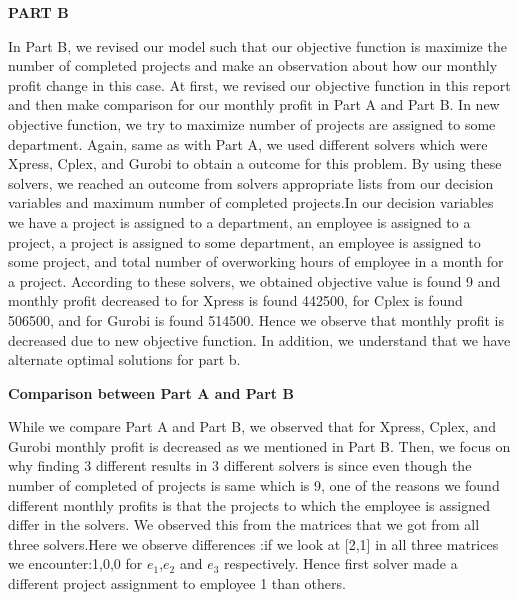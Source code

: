 \documentclass[11pt]{article}
\begin{document}
\begin{center}
{\bf PART B }
\end{center}
In Part B, we revised our model such that our objective function is maximize the number of completed projects and make an observation about how our monthly profit change in this case. At first, we revised our objective function in this report and then make comparison for our monthly profit in Part A and Part B. In new objective function, we try to maximize number of projects are assigned to some department. Again, same as with Part A, we used different solvers which were Xpress, Cplex, and Gurobi to obtain a outcome for this problem. By using these solvers, we reached an outcome from solvers appropriate lists from our decision variables and maximum number of completed projects.In our decision variables we have a project is assigned to a department, an employee is assigned to a project, a project is assigned to some department, an employee is assigned to some project, and total number of overworking hours of employee in a month for a project. According to these solvers, we obtained objective value is found 9  and monthly profit decreased to for Xpress is found 442500, for Cplex is found 506500, and for Gurobi is found 514500. Hence we observe that monthly profit is decreased due to new objective function. In addition, we understand that we have alternate optimal solutions for part b.

\newpage

\begin{center}
{\bf Comparison between Part A and Part B }
\end{center}
While we compare Part A and Part B, we observed that for Xpress, Cplex, and Gurobi monthly profit is decreased as we mentioned in Part B. Then, we focus on why finding 3 different results in 3 different solvers is since even though the number of completed of projects is same which is 9, one of the reasons we found different monthly profits is that the projects to which the employee is assigned differ in the solvers. We observed this from the matrices that we got from all three solvers.Here we observe differences :if we look at [2,1] in all three matrices we encounter:1,0,0 for  $e_1$,$e_2$ and $e_3$ respectively. Hence first solver made a different project assignment to employee 1 than others.
\end{document}
